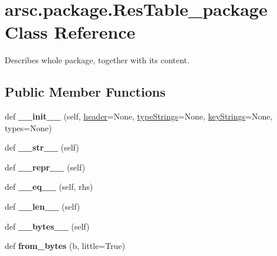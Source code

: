 \hypertarget{classarsc_1_1package_1_1ResTable__package}{}\section{arsc.\+package.\+Res\+Table\+\_\+package Class Reference}
\label{classarsc_1_1package_1_1ResTable__package}


Describes whole package, together with its content.  


\subsection*{Public Member Functions}
\begin{DoxyCompactItemize}
\item 
\mbox{\label{classarsc_1_1package_1_1ResTable__package_a7870701656d4d1823e05152f4fd0c0af}} 
def {\bfseries \+\_\+\+\_\+init\+\_\+\+\_\+} (self, \mbox{\hyperlink{classarsc_1_1package_1_1ResTable__package_a6a53c6e301e063885317883726cc8495}{header}}=None, \mbox{\hyperlink{classarsc_1_1package_1_1ResTable__package_a8e30c278b576f2a0a8ed342fb59e5c15}{type\+Strings}}=None, \mbox{\hyperlink{classarsc_1_1package_1_1ResTable__package_a6bf9b6aa4bfc9dabb5a494c9f66a2327}{key\+Strings}}=None, types=None)
\item 
\mbox{\label{classarsc_1_1package_1_1ResTable__package_aedf521a9d38f113659ebbc1c3fe16374}} 
def {\bfseries \+\_\+\+\_\+str\+\_\+\+\_\+} (self)
\item 
\mbox{\label{classarsc_1_1package_1_1ResTable__package_aa13791ad28a379171bf9280faff76dd2}} 
def {\bfseries \+\_\+\+\_\+repr\+\_\+\+\_\+} (self)
\item 
\mbox{\label{classarsc_1_1package_1_1ResTable__package_aae5d70784841b34c97b9cb6426ced742}} 
def {\bfseries \+\_\+\+\_\+eq\+\_\+\+\_\+} (self, rhs)
\item 
\mbox{\label{classarsc_1_1package_1_1ResTable__package_a681b4959e9bcc1b0d54a504ce05a7bdf}} 
def {\bfseries \+\_\+\+\_\+len\+\_\+\+\_\+} (self)
\item 
\mbox{\label{classarsc_1_1package_1_1ResTable__package_a82883cf44834dbcae4db524ed8899e04}} 
def {\bfseries \+\_\+\+\_\+bytes\+\_\+\+\_\+} (self)
\item 
\mbox{\label{classarsc_1_1package_1_1ResTable__package_a7539682ce5b40621dfd46072c76f7e96}} 
def {\bfseries from\+\_\+bytes} (b, little=True)
\end{DoxyCompactItemize}
